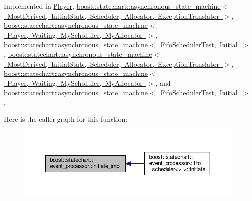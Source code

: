 Implemented in \mbox{\hyperlink{struct_player_ae5001b1a7c1ba022d7bdb6d7da25e647}{Player}}, \mbox{\hyperlink{classboost_1_1statechart_1_1asynchronous__state__machine_a7c4de22b056f8a85f2c163b6c5677f23}{boost\+::statechart\+::asynchronous\+\_\+state\+\_\+machine$<$ Most\+Derived, Initial\+State, Scheduler, Allocator, Exception\+Translator $>$}}, \mbox{\hyperlink{classboost_1_1statechart_1_1asynchronous__state__machine_a7c4de22b056f8a85f2c163b6c5677f23}{boost\+::statechart\+::asynchronous\+\_\+state\+\_\+machine$<$ Player, Waiting, My\+Scheduler, My\+Allocator $>$}}, \mbox{\hyperlink{classboost_1_1statechart_1_1asynchronous__state__machine_a7c4de22b056f8a85f2c163b6c5677f23}{boost\+::statechart\+::asynchronous\+\_\+state\+\_\+machine$<$ Fifo\+Scheduler\+Test, Initial $>$}}, \mbox{\hyperlink{classboost_1_1statechart_1_1asynchronous__state__machine_a346bde99a27dc391a0c4beb8c728dce0}{boost\+::statechart\+::asynchronous\+\_\+state\+\_\+machine$<$ Most\+Derived, Initial\+State, Scheduler, Allocator, Exception\+Translator $>$}}, \mbox{\hyperlink{classboost_1_1statechart_1_1asynchronous__state__machine_a346bde99a27dc391a0c4beb8c728dce0}{boost\+::statechart\+::asynchronous\+\_\+state\+\_\+machine$<$ Player, Waiting, My\+Scheduler, My\+Allocator $>$}}, and \mbox{\hyperlink{classboost_1_1statechart_1_1asynchronous__state__machine_a346bde99a27dc391a0c4beb8c728dce0}{boost\+::statechart\+::asynchronous\+\_\+state\+\_\+machine$<$ Fifo\+Scheduler\+Test, Initial $>$}}.

Here is the caller graph for this function\+:
\nopagebreak
\begin{figure}[H]
\begin{center}
\leavevmode
\includegraphics[width=350pt]{classboost_1_1statechart_1_1event__processor_a48a2bfcad66582f6c88e6034b2b838cb_icgraph}
\end{center}
\end{figure}
\mbox{\label{classboost_1_1statechart_1_1event__processor_ae38f310cc4422e28f7ff57d516f6e6b6}} 
